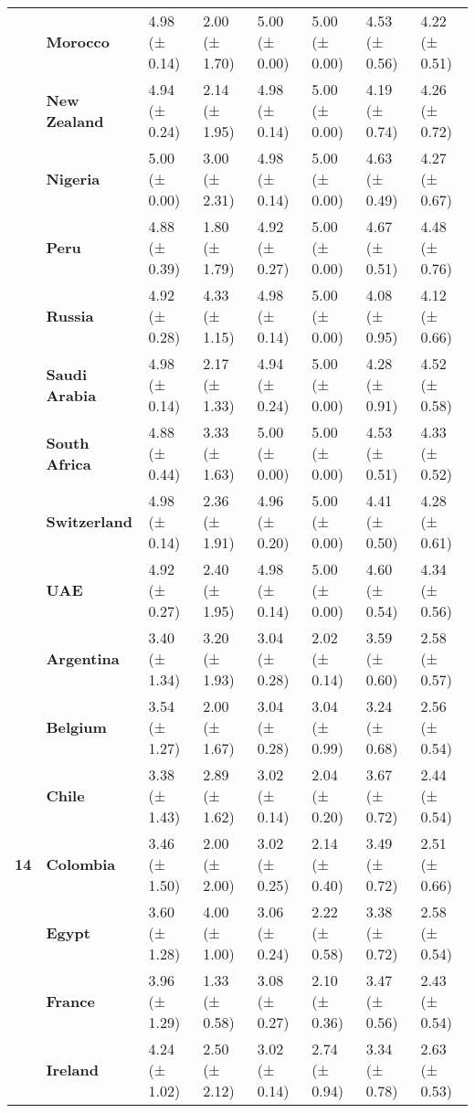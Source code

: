 \begin{tabular}{llllllll}
\textbf{} & \textbf{Morocco} & 4.98 (± 0.14) & 2.00 (± 1.70) & 5.00 (± 0.00) & 5.00 (± 0.00) & 4.53 (± 0.56) & 4.22 (± 0.51) \\
\textbf{} & \textbf{New Zealand} & 4.94 (± 0.24) & 2.14 (± 1.95) & 4.98 (± 0.14) & 5.00 (± 0.00) & 4.19 (± 0.74) & 4.26 (± 0.72) \\
\textbf{} & \textbf{Nigeria} & 5.00 (± 0.00) & 3.00 (± 2.31) & 4.98 (± 0.14) & 5.00 (± 0.00) & 4.63 (± 0.49) & 4.27 (± 0.67) \\
\textbf{} & \textbf{Peru} & 4.88 (± 0.39) & 1.80 (± 1.79) & 4.92 (± 0.27) & 5.00 (± 0.00) & 4.67 (± 0.51) & 4.48 (± 0.76) \\
\textbf{} & \textbf{Russia} & 4.92 (± 0.28) & 4.33 (± 1.15) & 4.98 (± 0.14) & 5.00 (± 0.00) & 4.08 (± 0.95) & 4.12 (± 0.66) \\
\textbf{} & \textbf{Saudi Arabia} & 4.98 (± 0.14) & 2.17 (± 1.33) & 4.94 (± 0.24) & 5.00 (± 0.00) & 4.28 (± 0.91) & 4.52 (± 0.58) \\
\textbf{} & \textbf{South Africa} & 4.88 (± 0.44) & 3.33 (± 1.63) & 5.00 (± 0.00) & 5.00 (± 0.00) & 4.53 (± 0.51) & 4.33 (± 0.52) \\
\textbf{} & \textbf{Switzerland} & 4.98 (± 0.14) & 2.36 (± 1.91) & 4.96 (± 0.20) & 5.00 (± 0.00) & 4.41 (± 0.50) & 4.28 (± 0.61) \\
\textbf{} & \textbf{UAE} & 4.92 (± 0.27) & 2.40 (± 1.95) & 4.98 (± 0.14) & 5.00 (± 0.00) & 4.60 (± 0.54) & 4.34 (± 0.56) \\
\cline{1-8}
\multirow[t]{19}{*}{\textbf{14}} & \textbf{Argentina} & 3.40 (± 1.34) & 3.20 (± 1.93) & 3.04 (± 0.28) & 2.02 (± 0.14) & 3.59 (± 0.60) & 2.58 (± 0.57) \\
\textbf{} & \textbf{Belgium} & 3.54 (± 1.27) & 2.00 (± 1.67) & 3.04 (± 0.28) & 3.04 (± 0.99) & 3.24 (± 0.68) & 2.56 (± 0.54) \\
\textbf{} & \textbf{Chile} & 3.38 (± 1.43) & 2.89 (± 1.62) & 3.02 (± 0.14) & 2.04 (± 0.20) & 3.67 (± 0.72) & 2.44 (± 0.54) \\
\textbf{} & \textbf{Colombia} & 3.46 (± 1.50) & 2.00 (± 2.00) & 3.02 (± 0.25) & 2.14 (± 0.40) & 3.49 (± 0.72) & 2.51 (± 0.66) \\
\textbf{} & \textbf{Egypt} & 3.60 (± 1.28) & 4.00 (± 1.00) & 3.06 (± 0.24) & 2.22 (± 0.58) & 3.38 (± 0.72) & 2.58 (± 0.54) \\
\textbf{} & \textbf{France} & 3.96 (± 1.29) & 1.33 (± 0.58) & 3.08 (± 0.27) & 2.10 (± 0.36) & 3.47 (± 0.56) & 2.43 (± 0.54) \\
\textbf{} & \textbf{Ireland} & 4.24 (± 1.02) & 2.50 (± 2.12) & 3.02 (± 0.14) & 2.74 (± 0.94) & 3.34 (± 0.78) & 2.63 (± 0.53) \\

\end{tabular}
